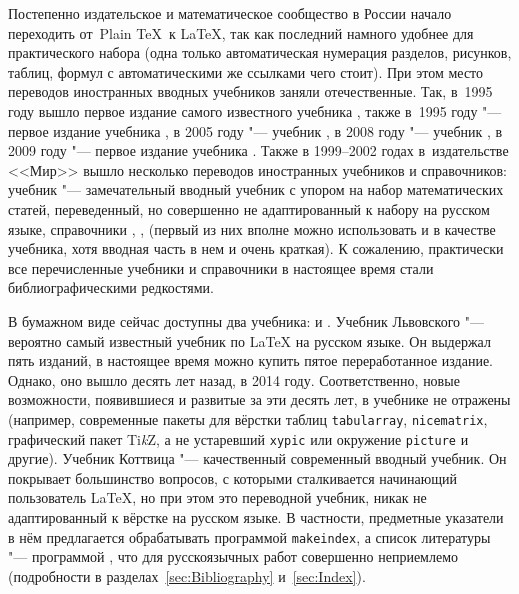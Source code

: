 \documentclass[a4paper,12pt,hyphens]{article}
\newcommand\package[1]{\texttt{#1}}
\newcommand\exe[1]{\texttt{#1}}
\DeclareRobustCommand{\TikZ}{\textrm{Ti\textit{k}Z}}
\begin{document}
Постепенно издательское и математическое сообщество в России начало переходить от~Plain \TeX\ к \LaTeX, так как последний
намного удобнее для практического набора (одна только автоматическая нумерация разделов, рисунков, таблиц, формул с автоматическими
же ссылками чего стоит). При этом место переводов иностранных вводных учебников заняли отечественные. Так, в~1995 году вышло первое издание самого известного учебника \parencite{lvovskiy:2014}, также в~1995 году "--- первое издание учебника \parencite{kotelnikov-chebotaev:2016}, в 2005 году "--- учебник \parencite{rozhenko:2005}, в 2008 году "--- учебник \parencite{baldin:2008}, в 2009 году "--- первое издание учебника \parencite{belyakov-palosh-sadovskiy:2012}. Также в 1999--2002 годах в~издательстве <<Мир>> вышло несколько переводов иностранных учебников и справочников: учебник \parencite{gratzer:2000} "--- замечательный вводный учебник с упором на набор математических статей, переведенный, но совершенно не адаптированный к набору на русском языке, справочники \parencite{gussens-mittelbach-samarin:1999}, \parencite{gussens-ratz:2001}, \parencite{gussens-ratz-mittelbach:2002} (первый из них вполне можно использовать и в качестве учебника, хотя вводная часть в нем и очень краткая). К сожалению, практически все перечисленные учебники и справочники в настоящее время стали библиографическими редкостями.

В бумажном виде сейчас доступны два учебника: \parencite{lvovskiy:2014} и \parencite{kottwitz:2022}. Учебник Львовского \parencite{lvovskiy:2014} "--- вероятно самый известный учебник по \LaTeX{} на русском языке. Он выдержал пять изданий, в настоящее время можно купить пятое переработанное издание. Однако, оно вышло десять лет назад, в 2014 году. Соответственно, новые возможности, появившиеся и развитые за эти десять лет, в учебнике не отражены (например, современные пакеты для вёрстки таблиц \package{tabularray}, \package{nicematrix}, графический пакет \TikZ, а не устаревший \package{xypic} \parencite{ctan-xypic} или окружение \package{picture} и другие). Учебник Коттвица \parencite{kottwitz:2022} "--- качественный современный вводный учебник. Он покрывает большинство вопросов, с которыми сталкивается начинающий пользователь \LaTeX, но при этом это переводной учебник, никак не адаптированный к вёрстке на русском языке. В частности, предметные указатели в нём предлагается обрабатывать программой \exe{makeindex}, а список литературы "--- программой \BibTeX, что для русскоязычных работ совершенно неприемлемо (подробности в разделах~\ref{sec:Bibliography} и~\ref{sec:Index}).
\end{document}
